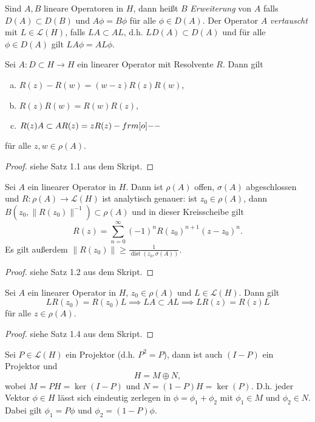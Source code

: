 \documentclass{mycourse}
\newcommand{\dist}{\operatorname{dist}}
\begin{document}
Sind $A,B$ lineare Operatoren in $H$, dann heißt $B$ \emph{Erweiterung} von $A$ falls $D(A) \subset D(B)$ und $A\phi=B\phi$ für alle $\phi \in D(A)$. Der Operator $A$ \emph{vertauscht} mit $L\in \mathcal L(H)$, falls $LA\subset AL$, d.h. $LD(A)\subset D(A)$ und für alle $\phi \in D(A)$ gilt $LA\phi=AL\phi$.
\begin{st}\label{1.1}
Sei $A: D \subset H\to H$ ein linearer Operator mit Resolvente $R$. Dann gilt
\begin{enumerate}[a)]
\item $R(z)-R(w)=(w-z) R(z) R(w)$,
\item $R(z) R(w)=R(w) R(z)$,
\item $R(z) A\subset A R(z)=zR(z)-\1$
\end{enumerate}
für alle $z,w\in \rho(A)$.
\end{st}
\begin{proof}
siehe Satz 1.1 aus dem Skript.
\end{proof}
\begin{st} \label{1.2} Sei $A$ ein linearer Operator in $H$. Dann ist $\rho(A)$ offen, $\sigma(A)$ abgeschlossen und $R: \rho(A) \to \mathcal L(H)$ ist analytisch genauer: ist $z_0\in \rho(A)$, dann $B(z_0, \| R(z_0)\|^{-1}) \subset \rho(A)$ und in dieser Kreisscheibe gilt
\[
R(z)=\sum_{n=0}^\infty (-1)^n R(z_0)^{n+1} (z-z_0)^n.
\]
Es gilt außerdem $\|R(z_0)\|\ge \frac{1}{\dist(z_0, \sigma(A))}$.
\end{st}
\begin{proof}
siehe Satz 1.2 aus dem Skript.
\end{proof}
\begin{st}
Sei $A$ ein linearer Operator in $H$, $z_0\in \rho(A)$ und $L\in \mathcal L(H)$. Dann gilt 
\[
LR(z_0)=R(z_0)L \implies LA \subset AL \implies LR(z)=R(z)L
\]
für alle $z\in \rho(A)$.
\end{st}
\begin{proof}
siehe Satz 1.4 aus dem Skript.
\end{proof}

Sei $P\in \mathcal L(H)$ ein Projektor (d.h. $P^2=P$), dann ist auch $(I-P)$ ein Projektor und 
\[
H=M \oplus N,
\]
wobei $M=PH=\ker(I-P)$ und $N=(1-P)H=\ker(P)$. D.h. jeder Vektor $\phi\in H$ lässt sich eindeutig zerlegen in $\phi=\phi_1+\phi_2$ mit $\phi_1\in M$ und $\phi_2\in N$. Dabei gilt $\phi_1=P\phi$ und $\phi_2=(1-P)\phi$.
\end{document}
